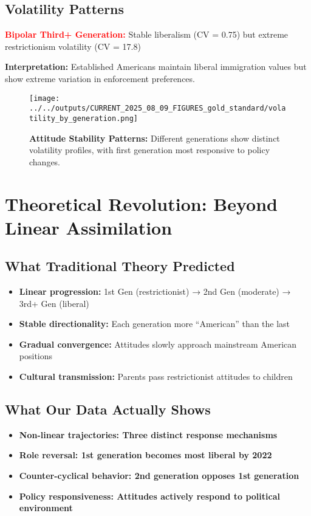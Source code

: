 \documentclass[11pt,letterpaper]{article}
\newcommand{\keyfinding}[1]{\colorbox{yellow!20}{\textbf{#1}}}
\newcommand{\surprise}[1]{\textcolor{red}{\textbf{#1}}}
\begin{document}
\subsection{Volatility Patterns}
\surprise{\textbf{Bipolar Third+ Generation:}} Stable liberalism (CV = 0.75) but extreme restrictionism volatility (CV = 17.8)

\textbf{Interpretation:} Established Americans maintain liberal immigration values but show extreme variation in enforcement preferences.

\begin{figure}[H]
    \centering
    \texttt{[image: ../../outputs/CURRENT\_2025\_08\_09\_FIGURES\_gold\_standard/volatility\_by\_generation.png]}
    \caption{\textbf{Attitude Stability Patterns:} Different generations show distinct volatility profiles, with first generation most responsive to policy changes.}
    \label{fig:volatility}
\end{figure}

\section{Theoretical Revolution: Beyond Linear Assimilation}

\subsection{What Traditional Theory Predicted}
\begin{itemize}
    \item \textbf{Linear progression:} 1st Gen (restrictionist) → 2nd Gen (moderate) → 3rd+ Gen (liberal)
    \item \textbf{Stable directionality:} Each generation more ``American'' than the last
    \item \textbf{Gradual convergence:} Attitudes slowly approach mainstream American positions
    \item \textbf{Cultural transmission:} Parents pass restrictionist attitudes to children
\end{itemize}

\subsection{What Our Data Actually Shows}
\begin{itemize}
    \item \keyfinding{\textbf{Non-linear trajectories:} Three distinct response mechanisms}
    \item \keyfinding{\textbf{Role reversal:} 1st generation becomes most liberal by 2022}
    \item \keyfinding{\textbf{Counter-cyclical behavior:} 2nd generation opposes 1st generation}
    \item \keyfinding{\textbf{Policy responsiveness:} Attitudes actively respond to political environment}
\end{itemize}
\end{document}
